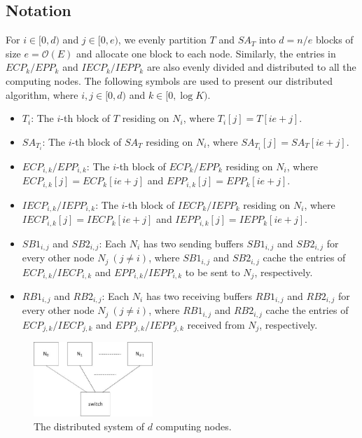\documentclass[10pt,journal,letterpaper,compsoc]{IEEEtran}
\begin{document}
\begin{CJK*}{GBK}{song}
\subsection{Notation}

For $i\in [0,d)$ and $j\in [0,e)$, we evenly partition $T$ and $SA_T$ into $d=n/e$ blocks of size $e=\mathcal{O}(E)$ and allocate one block to each node. Similarly, the entries in $ECP_k/EPP_k$ and $IECP_k/IEPP_k$ are also evenly divided and distributed to all the computing nodes. The following symbols are used to present our distributed algorithm, where $i,j\in [0,d)$ and $k\in [0,\log K)$.

\begin{itemize}
\item $T_i$: The $i$-th block of $T$ residing on $N_i$, where $T_i[j] = T[ie+j]$.
\item $SA_{T_i}$: The $i$-th block of $SA_T$ residing on $N_i$, where $SA_{T_i}[j] = SA_T[ie+j]$.
\item $ECP_{i,k}/EPP_{i,k}$: The $i$-th block of $ECP_{k}/EPP_{k}$ residing on $N_i$, where $ECP_{i,k}[j] = ECP_k[ie+j]$ and $EPP_{i,k}[j] = EPP_k[ie+j]$.
\item $IECP_{i,k}/IEPP_{i,k}$: The $i$-th block of $IECP_{k}/IEPP_{k}$ residing on $N_i$, where $IECP_{i,k}[j] = IECP_k[ie+j]$ and $IEPP_{i,k}[j] = IEPP_k[ie+j]$.
\item $SB1_{i,j}$ and $SB2_{i,j}$: Each $N_i$ has two sending buffers $SB1_{i,j}$ and $SB2_{i,j}$ for every other node $N_j~(j\ne i)$, where $SB1_{i,j}$ and $SB2_{i,j}$ cache the entries of $ECP_{i,k}/IECP_{i,k}$ and $EPP_{i,k}/IEPP_{i,k}$ to be sent to $N_j$, respectively.
\item $RB1_{i,j}$ and $RB2_{i,j}$: Each $N_i$ has two receiving buffers $RB1_{i,j}$ and $RB2_{i,j}$ for every other node $N_j~(j\ne i)$, where $RB1_{i,j}$ and $RB2_{i,j}$ cache the entries of $ECP_{j,k}/IECP_{j,k}$ and $EPP_{j,k}/IEPP_{j,k}$ received from $N_j$, respectively.
\end{itemize}

\begin{figure}[hbtp!]
  \centering
  \includegraphics[width=0.4\textwidth]{distributed_system.eps}
  \caption{The distributed system of $d$ computing nodes. }
  \label{fig:distributed_system}
\end{figure}



\end{CJK*}
\end{document}
